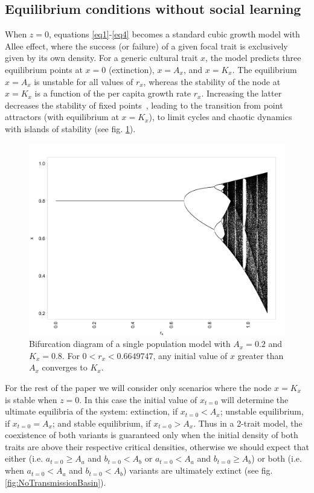 \documentclass[review,authoryear]{elsarticle}
\begin{document}
\subsection{Equilibrium conditions without social learning}

When $z=0$, equations \ref{eq1}-\ref{eq4} becomes a standard cubic growth model with Allee effect, where the success (or failure) of a given focal trait is exclusively given by its own density. For a generic cultural trait $x$, the model predicts three equilibrium points at $x=0$ (extinction), $x=A_x$, and $x=K_x$. The equilibrium $x=A_x$ is unstable for all values of $r_x$, whereas the stability of the node at $x=K_x$ is a function of the per capita growth rate $r_x$. Increasing the latter decreases the stability of fixed points~\citep{scheuring_1999}, leading to the transition from point attractors (with equilibrium at $x=K_x$), to limit cycles and chaotic dynamics with islands of stability (see fig. \ref{fig:bifurcationDiagram}). 

\begin{figure}[h!]
  \centering
      \includegraphics[width=1\textwidth]{./figures/figure1.jpg}
  \caption{Bifurcation diagram of a single population model with $A_x=0.2$ and $K_x=0.8$. For $0<r_x<0.6649747$, any initial value of $x$ greater than $A_x$ converges to $K_x$.}
    \label{fig:bifurcationDiagram}
\end{figure}

For the rest of the paper we will consider only scenarios where the node $x=K_x$ is stable when $z=0$. In this case the initial value of $x_{t=0}$ will determine the ultimate equilibria of the system: extinction, if $x_{t=0}<A_x$; unstable equilibrium, if $x_{t=0}=A_x$; and stable equilibrium, if $x_{t=0}>A_x$. Thus in a 2-trait model, the coexistence of both variants is guaranteed only when the initial density of both traits are above their respective critical densities, otherwise we should expect that either (i.e. $a_{t=0} \geq A_a$ and $b_{t=0}<A_b$ or $a_{t=0}<A_a$ and $b_{t=0} \geq A_b$) or both (i.e. when $a_{t=0}<A_a$ and $b_{t=0}<A_b$) variants are ultimately extinct (see fig. \ref{fig:NoTransmissionBasin}). 
\end{document}
